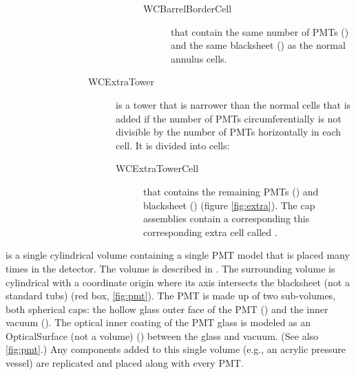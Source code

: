 \begin{description}
\begin{description}
\begin{description}
\begin{description}
\begin{description}
          \begin{description}
            \item[WCBarrelBorderCell] that contain the same number of PMTs () and the same blacksheet () as the normal annulus cells.
          \end{description}
        \end{description}
        \item[WCExtraTower] is a tower that is narrower than the normal cells that is added if the number of PMTs circumferentially is not divisible by the number of PMTs horizontally in each cell.  It is divided into cells:
        \begin{description}
            \item[WCExtraTowerCell] that contains the remaining PMTs () and blacksheet  () (figure \ref{fig:extra}).  The cap assemblies contain a corresponding this corresponding extra cell called .
        \end{description}
      \end{description}
    \end{description}
  \end{description}
\end{description}      



 is a single cylindrical volume containing a single PMT model that is placed many times in the detector.  The volume is described in .  The surrounding volume is cylindrical with a coordinate origin where its axis intersects the blacksheet (not a standard tubs) (red box, \ref{fig:pmt}).  The PMT is made up of two sub-volumes, both spherical caps: the hollow glass outer face of the PMT () and the inner vacuum ().  The optical inner coating of the PMT glass is modeled as an OpticalSurface (not a volume) () between the glass and vacuum.  (See also \ref{fig:pmt}.)  Any components added to this single volume (e.g., an acrylic pressure vessel) are replicated and placed along with every PMT.


